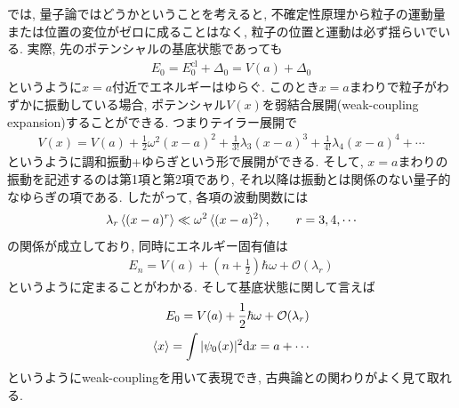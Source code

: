 \documentclass[dvipdfmx,11pt,a4paper,oneside,openany]{jsbook}
\begin{document}
では, 量子論ではどうかということを考えると, 不確定性原理から粒子の運動量または位置の変位がゼロに成ることはなく, 粒子の位置と運動は必ず揺らいでいる. 実際, 先のポテンシャルの基底状態であっても
\begin{align}
    E_0=E_{0}^{\text{cl}}+\Delta_0=V(a)+\Delta_0
\end{align}
というように$x=a$付近でエネルギーはゆらぐ. このとき$x=a$まわりで粒子がわずかに振動している場合, ポテンシャル$V(x)$を弱結合展開(weak-coupling expansion)することができる. つまりテイラー展開で
\begin{align}
    V(x)=V(a)+\frac{1}{2}\omega^2(x-a)^2+\frac{1}{3!}\lambda_3(x-a)^3+\frac{1}{4!}\lambda_4(x-a)^4+\cdots
\end{align}
というように調和振動+ゆらぎという形で展開ができる. そして, $x=a$まわりの振動を記述するのは第1項と第2項であり, それ以降は振動とは関係のない量子的なゆらぎの項である. したがって, 各項の波動関数には
\begin{align}
    \lambda_r\braket{(x-a)^r} \ll \omega^2\braket{(x-a)^2}, \qquad r=3,4,\cdots
\end{align}
の関係が成立しており, 同時にエネルギー固有値は
\begin{align}
    E_n=V(a)+\left(n+\frac{1}{2}\right)\hbar\omega+\mathcal{O}(\lambda_r)
\end{align}
というように定まることがわかる. そして基底状態に関して言えば
\begin{align}
    E_0=V(a)+\frac{1}{2}\hbar\omega+\mathcal{O}(\lambda_r)\label{eq:5.9} \\
    \braket{x}=\int |\psi_0(x)|^2 \mathrm{d}x=a+\cdots
\end{align}
というようにweak-couplingを用いて表現でき, 古典論との関わりがよく見て取れる.
\end{document}

